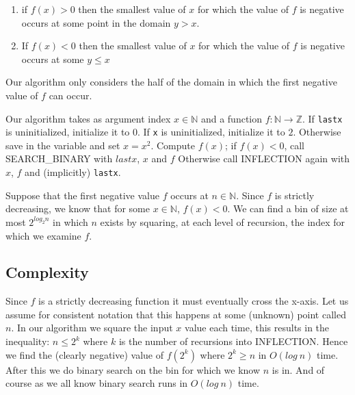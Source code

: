 \documentclass{amsart}
\theoremstyle{definition}
\theoremstyle{remark}
\numberwithin{equation}{section}
\newcommand{\NN}{\mathbb N}
\newcommand{\ZZ}{\mathbb Z}
\begin{document}
\begin{enumerate}

  \item if $f(x) > 0$ then the smallest value of $x$ for which the value
of $f$ is negative occurs at some point in the domain $y>x$.

  \item If $f(x) < 0$ then the smallest value of $x$ for which the value
  of $f$ is negative occurs at some $y \leq x$

\end{enumerate}

Our algorithm only considers the half of the domain in which the first negative
value of $f$ can occur.


Our algorithm takes as argument index $x \in \NN$ and a function $f :
\NN \rightarrow \ZZ$. If \texttt{lastx} is uninitialized, initialize it to $0$.
If \texttt{x} is uninitialized, initialize it to $2$. Otherwise save  in the
variable  and set $x = x^2$. Compute $f(x)$; if $f(x) < 0$, call
SEARCH\_BINARY with $lastx$, $x$ and $f$ Otherwise call INFLECTION again
with $x$, $f$ and (implicitly) \texttt{lastx}.

\proof
Suppose that the first negative value $f$ occurs at $n \in \NN$.
Since $f$ is strictly decreasing, we know that for some $x \in \NN$, $f(x) < 0$.
We can find a bin of size at most $2^{log_{2} {n}}$ in which $n$ exists by
squaring, at each level of recursion, the index for which we examine $f$.

\subsection{Complexity}

Since $f$ is a strictly decreasing function it must eventually cross the
x-axis. Let us assume for consistent notation that this happens at some
(unknown) point called $n$. In our algorithm we square the input $x$
value each time, this results in the inequality: $n \leq 2^k$ where $k$
is the number of recursions into INFLECTION. Hence we find the (clearly
negative) value of $f(2^k)$ where $2^k \geq n$ in $O(log\ n)$ time.
After this we do binary search on the bin for which we know $n$ is in.
And of course as we all know binary search runs in $O( log\ n )$ time.


\section{}
\end{document}
